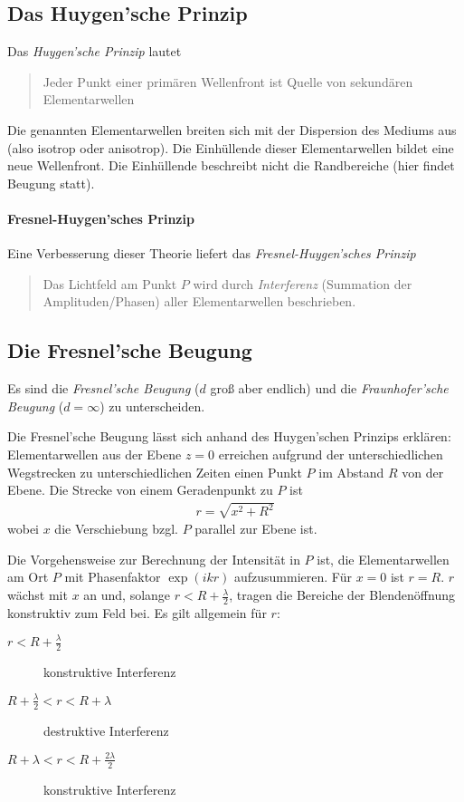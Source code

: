 \subsection{Das Huygen'sche Prinzip}
Das \emph{Huygen'sche Prinzip} lautet
\begin{quote}
  Jeder Punkt einer primären Wellenfront ist Quelle von sekundären
  Elementarwellen
\end{quote}
Die genannten Elementarwellen breiten sich mit der Dispersion des
Mediums aus (also isotrop oder anisotrop).
Die Einhüllende dieser Elementarwellen bildet eine neue Wellenfront.
Die Einhüllende beschreibt nicht die Randbereiche (hier findet Beugung statt).

\paragraph{Fresnel-Huygen'sches Prinzip}
Eine Verbesserung dieser Theorie liefert das 
\emph{Fresnel-Huygen'sches Prinzip}
\begin{quote}
  Das Lichtfeld am Punkt $P$ wird durch \emph{Interferenz} (Summation
  der Amplituden/Phasen) aller Elementarwellen beschrieben.
\end{quote}


\subsection{Die Fresnel'sche Beugung}
Es sind die \emph{Fresnel'sche Beugung} 
($d$ groß aber endlich) und die \emph{Fraunhofer'sche Beugung}%
 ($d=\infty$) zu unterscheiden.

Die Fresnel'sche Beugung lässt sich anhand des Huygen'schen Prinzips
erklären:
Elementarwellen aus der Ebene $z=0$ erreichen aufgrund der
unterschiedlichen Wegstrecken zu unterschiedlichen Zeiten einen Punkt
$P$ im Abstand $R$ von der Ebene.
Die Strecke von einem Geradenpunkt zu $P$ ist
\begin{gather*}
  r = \sqrt{x^2+R^2}
\end{gather*}
wobei $x$ die Verschiebung bzgl. $P$ parallel zur Ebene ist.

Die Vorgehensweise zur Berechnung der Intensität in $P$ ist, die
Elementarwellen am Ort $P$ mit Phasenfaktor $\exp(ikr)$ aufzusummieren.
Für $x=0$ ist $r=R$. $r$ wächst mit $x$ an und, solange $r<R+\frac{\lambda}{2}$, tragen die
Bereiche der Blendenöffnung konstruktiv zum Feld bei.
Es gilt allgemein für $r$:
\begin{description}
\item[$r<R+\frac{\lambda}{2}$] konstruktive Interferenz
\item[$R+\frac{\lambda}{2}<r<R+\lambda$] destruktive Interferenz
\item[$R+\lambda<r<R+\frac{2\lambda}{2}$] konstruktive Interferenz
\end{description}

